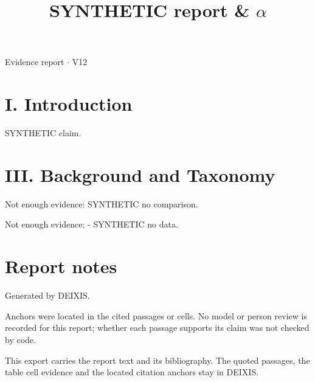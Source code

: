 \documentclass[journal]{IEEEtran}
\begin{document}
\title{SYNTHETIC report \& \ensuremath{\alpha}}

\maketitle

\noindent Evidence report \ensuremath{\cdot} V12

\section*{I. Introduction}

SYNTHETIC claim. \cite{Synth26}

\section*{III. Background and Taxonomy}

Not enough evidence: SYNTHETIC no comparison.

Not enough evidence: - SYNTHETIC no data.

\section*{Report notes}

Generated by DEIXIS.

Anchors were located in the cited passages or cells. No model or person review is recorded for this report; whether each passage supports its claim was not checked by code.

This export carries the report text and its bibliography. The quoted passages, the table cell evidence and the located citation anchors stay in DEIXIS.




\end{document}
